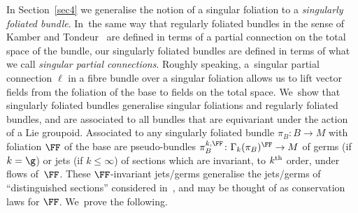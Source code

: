 In Section~\ref{sec4} we generalise the notion of a singular foliation to a \textit{singularly foliated bundle}. In~the same way that regularly foliated bundles in the sense of Kamber and Tondeur~\cite{folbund} are defined in terms of a partial connection on the total space of the bundle, our singularly foliated bundles are defined in terms of what we call \textit{singular partial connections}. Roughly speaking, a~singular partial connection $\ell$ in a fibre bundle over a singular foliation allows us to lift vector fields from the foliation of the base to fields on the total space. We~show that singularly foliated bundles generalise singular foliations and regularly foliated bundles, and are associated to all bundles that are equivariant under the action of a Lie groupoid. Associated to any singularly foliated bundle $\pi_{B}\colon B\rightarrow M$ with foliation $\FF$ of the base are pseudo-bundles $\pi_{B}^{k,\FF}\colon \Gamma_{k}(\pi_{B})^{\FF}\rightarrow M$ of germs (if~$k=\g$) or jets (if $k\leq\infty$) of sections which are invariant, to $k^{\rm th}$ order, under flows of~$\FF$. These $\FF$-invariant jets/germs generalise the jets/germs of ``distinguished sections'' considered in~\cite{mac3}, and may be thought of as conservation laws for $\FF$. We~prove the following.
